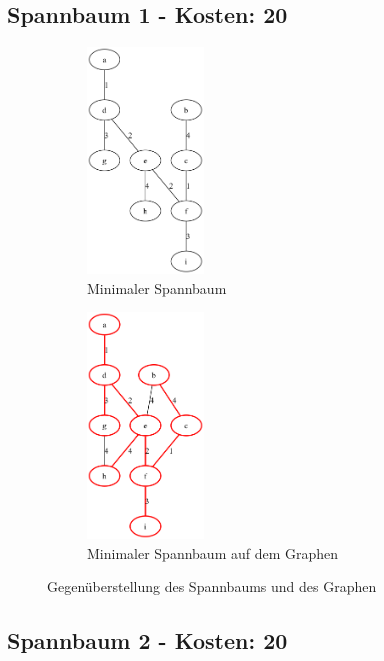\documentclass[a4paper,11pt]{report}
\begin{document}
    \subsection{Spannbaum 1 - Kosten: 20}\label{subsec:spannbaum-1---kosten:-20}

    \begin{figure}[htbp]
        \centering
        \begin{subfigure}[b]{0.4\textwidth}
            \centering
            \includegraphics[width=\textwidth, height=6cm, keepaspectratio]{a03a_mst_1}
            \caption{Minimaler Spannbaum}
            \label{fig:a03_mst_01}
        \end{subfigure}
        \begin{subfigure}[b]{0.4\textwidth}
            \centering
            \includegraphics[width=\textwidth, height=6cm, keepaspectratio]{a03a_mst_1_highlighted}
            \caption{Minimaler Spannbaum auf dem Graphen}
            \label{fig:a03_mst_01_highlighted}
        \end{subfigure}
        \caption{Gegenüberstellung des Spannbaums und des Graphen}
        \label{fig:a03_01}
    \end{figure}
    \FloatBarrier

    \subsection{Spannbaum 2 - Kosten: 20}\label{subsec:spannbaum-2---kosten:-20}
\end{document}
